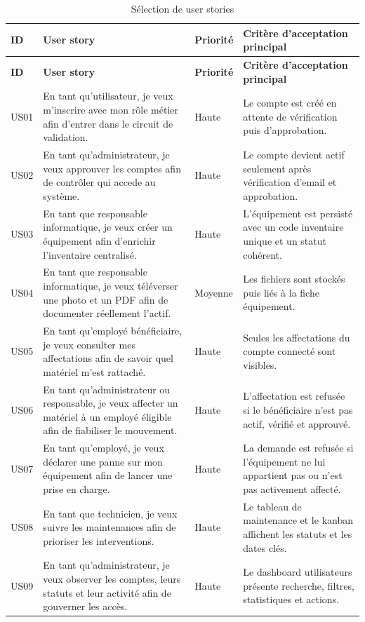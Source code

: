 ﻿\documentclass[12pt,a4paper,oneside]{report}
\begin{document}
\begin{longtable}{p{1.5cm}p{4.8cm}p{3cm}p{5.1cm}}
\caption{Sélection de user stories}\\
\toprule
\textbf{ID} & \textbf{User story} & \textbf{Priorité} & \textbf{Critère d'acceptation principal} \\
\midrule
\endfirsthead
\toprule
\textbf{ID} & \textbf{User story} & \textbf{Priorité} & \textbf{Critère d'acceptation principal} \\
\midrule
\endhead
US01 & En tant qu'utilisateur, je veux m'inscrire avec mon rôle métier afin d'entrer dans le circuit de validation. & Haute & Le compte est créé en attente de vérification puis d'approbation. \\
US02 & En tant qu'administrateur, je veux approuver les comptes afin de contrôler qui accede au système. & Haute & Le compte devient actif seulement après vérification d'email et approbation. \\
US03 & En tant que responsable informatique, je veux créer un équipement afin d'enrichir l'inventaire centralisé. & Haute & L'équipement est persisté avec un code inventaire unique et un statut cohérent. \\
US04 & En tant que responsable informatique, je veux téléverser une photo et un PDF afin de documenter réellement l'actif. & Moyenne & Les fichiers sont stockés puis liés à la fiche équipement. \\
US05 & En tant qu'employé bénéficiaire, je veux consulter mes affectations afin de savoir quel matériel m'est rattaché. & Haute & Seules les affectations du compte connecté sont visibles. \\
US06 & En tant qu'administrateur ou responsable, je veux affecter un matériel à un employé éligible afin de fiabiliser le mouvement. & Haute & L'affectation est refusée si le bénéficiaire n'est pas actif, vérifié et approuvé. \\
US07 & En tant qu'employé, je veux déclarer une panne sur mon équipement afin de lancer une prise en charge. & Haute & La demande est refusée si l'équipement ne lui appartient pas ou n'est pas activement affecté. \\
US08 & En tant que technicien, je veux suivre les maintenances afin de prioriser les interventions. & Haute & Le tableau de maintenance et le kanban affichent les statuts et les dates clés. \\
US09 & En tant qu'administrateur, je veux observer les comptes, leurs statuts et leur activité afin de gouverner les accès. & Haute & Le dashboard utilisateurs présente recherche, filtres, statistiques et actions. \\

\end{longtable}
\end{document}
